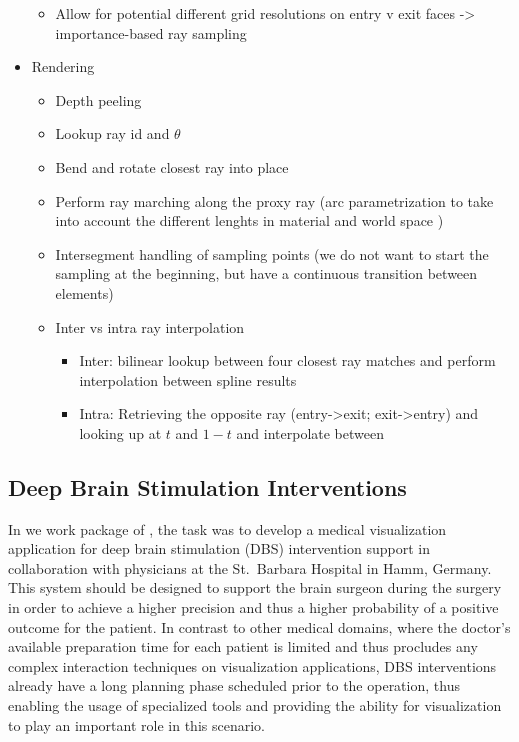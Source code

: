 \begin{itemize}
\begin{itemize}
    \item Allow for potential different grid resolutions on entry v exit faces -> importance-based ray sampling
\end{itemize}
\item Rendering
\begin{itemize}
    \item Depth peeling \cite{mammen89DepthPeeling}
    \item Lookup ray id and $\theta$
    \item Bend and rotate closest ray into place
    \item Perform ray marching along the proxy ray (arc parametrization to take into account the different lenghts in material and world space \cite{guenter90arclength})
    \item Intersegment handling of sampling points (we do not want to start the sampling at the beginning, but have a continuous transition between elements)
    \item Inter vs intra ray interpolation
    \begin{itemize}
        \item Inter: bilinear lookup between four closest ray matches and perform interpolation between spline results
        \item Intra: Retrieving the opposite ray (entry->exit; exit->entry) and looking up at $t$ and $1-t$ and interpolate between
    \end{itemize}
\end{itemize}

\end{itemize}

\subsection{Deep Brain Stimulation Interventions}
\label{contributions:medbio:dbs}
In we work package of , the task was to develop a medical visualization application for deep brain stimulation (DBS) intervention support in collaboration with physicians at the St.~Barbara Hospital in Hamm, Germany. This system should be designed to support the brain surgeon during the surgery in order to achieve a higher precision and thus a higher probability of a positive outcome for the patient. In contrast to other medical domains, where the doctor's available preparation time for each patient is limited and thus procludes any complex interaction techniques on visualization applications, DBS interventions already have a long planning phase scheduled prior to the operation, thus enabling the usage of specialized tools and providing the ability for visualization to play an important role in this scenario.

